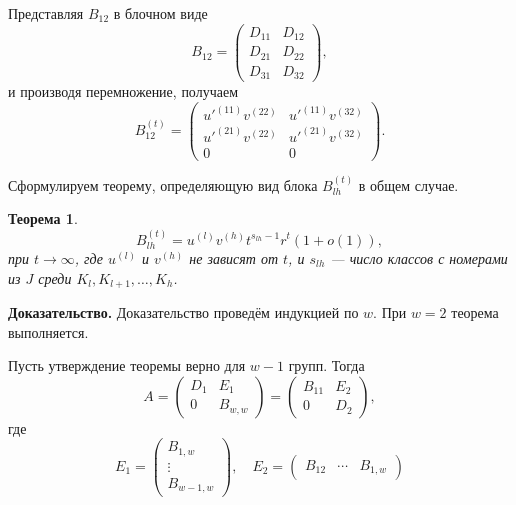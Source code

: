 \documentclass[11pt]{article}
\newtheorem{theorem}{Теорема}
\begin{document}
Представляя $B_{12}$ в блочном виде
\begin{equation}
    B_{12} = 
    \begin{pmatrix}
        D_{11} & D_{12} \\
        D_{21} & D_{22} \\
        D_{31} & D_{32}
    \end{pmatrix},
\end{equation}
и производя перемножение, получаем
\begin{equation}
    B_{12}^{(t)} = 
    \begin{pmatrix}
        u'^{(11)} v^{(22)} & u'^{(11)} v^{(32)} \\
        u'^{(21)} v^{(22)} & u'^{(21)} v^{(32)} \\
        0 & 0
    \end{pmatrix}.
\end{equation}

Сформулируем теорему, определяющую вид блока $B_{lh}^{(t)}$ в общем случае.
\begin{theorem}
    \begin{equation}
        B_{lh}^{(t)} = u^{(l)} v^{(h)} t^{s_{lh} - 1} r^t (1 + o(1)),
    \end{equation}
    при $t \rightarrow \infty$, где $u^{(l)}$ и $v^{(h)}$ не зависят от $t$, и $s_{lh}$ --- число классов с номерами из $J$ среди $K_l, K_{l+1}, \ldots, K_h$.
\end{theorem}

\textbf{Доказательство.} Доказательство проведём индукцией по $w$. При $w = 2$ теорема выполняется.

Пусть утверждение теоремы верно для $w-1$ групп. Тогда
\begin{equation}
    A = 
    \begin{pmatrix}
        D_1 & E_1 \\
        0 & B_{w,w}
    \end{pmatrix}
    =
    \begin{pmatrix}
        B_{11} & E_2 \\
        0 & D_2
    \end{pmatrix},
\end{equation}
где
\begin{equation}
    E_1 = 
    \begin{pmatrix}
        B_{1,w} \\
        \vdots \\
        B_{w-1,w}
    \end{pmatrix},
    \quad{}E_2 = 
    \begin{pmatrix}
        B_{12} & \cdots & B_{1,w}
    \end{pmatrix}
\end{equation}
\end{document}
